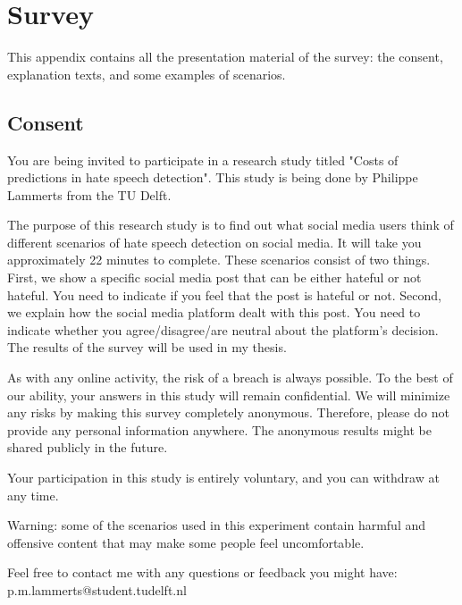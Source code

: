 \chapter{Survey}
\label{sec:appendix}
This appendix contains all the presentation material of the survey: the consent, explanation texts, and some examples of scenarios.
\section{Consent}
\begin{flushleft}
    You are being invited to participate in a research study titled "Costs of predictions in hate speech detection". This study is being done by Philippe Lammerts from the TU Delft.
\end{flushleft}
\begin{flushleft}
    The purpose of this research study is to find out what social media users think of different scenarios of hate speech detection on social media. It will take you approximately 22 minutes to complete. These scenarios consist of two things. First, we show a specific social media post that can be either hateful or not hateful. You need to indicate if you feel that the post is hateful or not. Second,  we explain how the social media platform dealt with this post. You need to indicate whether you agree/disagree/are neutral about the platform's decision. The results of the survey will be used in my thesis.
\end{flushleft}
\begin{flushleft}
    As with any online activity, the risk of a breach is always possible. To the best of our ability, your answers in this study will remain confidential. We will minimize any risks by making this survey completely anonymous. Therefore, please do not provide any personal information anywhere. The anonymous results might be shared publicly in the future.
\end{flushleft}
\begin{flushleft}
    Your participation in this study is entirely voluntary, and you can withdraw at any time.
\end{flushleft}
\begin{flushleft}
    Warning: some of the scenarios used in this experiment contain harmful and offensive content that may make some people feel uncomfortable.
\end{flushleft}
\begin{flushleft}
    Feel free to contact me with any questions or feedback you might have:
    p.m.lammerts@student.tudelft.nl
\end{flushleft}

